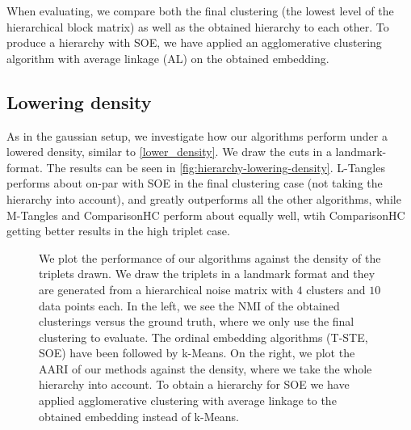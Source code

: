 When evaluating, we compare both the final clustering (the lowest level of the hierarchical block matrix) as well as the obtained hierarchy to each other. 
To produce a hierarchy with SOE, we have applied an agglomerative clustering algorithm with average linkage (AL) on the obtained embedding.

\subsection{Lowering density}
As in the gaussian setup, we investigate how our algorithms perform under a lowered density, similar to \autoref{lower_density}. We draw the cuts in a landmark-format. The results can be seen in 
\autoref{fig:hierarchy-lowering-density}. L-Tangles performs about on-par with SOE in the final clustering case (not taking the hierarchy into account), and greatly outperforms all the other 
algorithms, while M-Tangles and ComparisonHC perform about equally well, wtih ComparisonHC getting better results in the high triplet case.

\onecolumn
\begin{figure}[ht]
    \centering
    \caption{
        We plot the performance of our algorithms against the density of the triplets drawn. We draw the triplets in a landmark format 
        and they are generated from a hierarchical noise matrix with $4$ clusters and $10$ data points each. In the left, we see the NMI of 
        the obtained clusterings versus the ground truth, where we only use the final clustering to evaluate. The ordinal embedding algorithms
        (T-STE, SOE) have been followed by k-Means. On the right, 
        we plot the AARI of our methods against the density, where we take the whole hierarchy into account. To obtain a hierarchy for SOE
        we have applied agglomerative clustering with average linkage to the obtained embedding instead of k-Means.
    }
    \label{fig:hierarchy-add-triplet-noise}
\end{figure}

